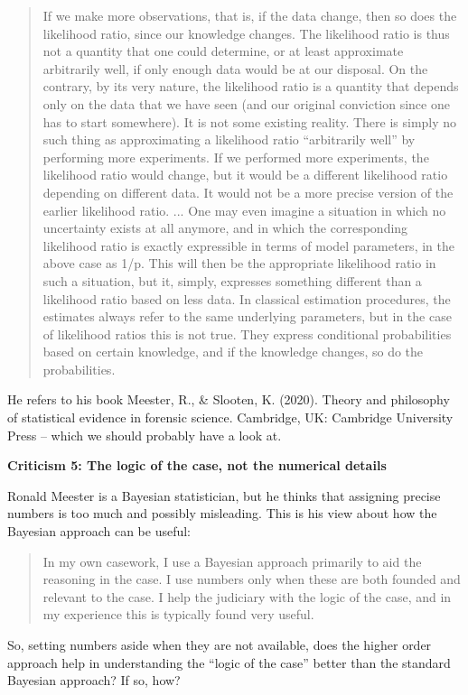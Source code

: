 \documentclass[
  10pt,
  dvipsnames,enabledeprecatedfontcommands]{scrartcl}
\begin{document}
\begin{quote}
If we make more observations, that is, if the data change, then so does the likelihood ratio, since our knowledge changes. The likelihood ratio is thus not a quantity that one could determine, or at least approximate arbitrarily well, if only enough data would be at our disposal. On the contrary, by its very nature, the likelihood ratio is a quantity that depends only on the data that we have seen (and our original conviction since one has to start somewhere). It is not some existing reality. There is simply no such thing as approximating a likelihood ratio “arbitrarily well” by performing more experiments. If we performed more experiments, the likelihood ratio would change, but it would be a different likelihood ratio depending on different data. It would not be a more precise version of the earlier likelihood ratio. ... One may even imagine a situation in which no uncertainty exists at all anymore, and in which the corresponding likelihood ratio is exactly expressible in terms of model parameters, in the above case as 1/p. This will then be the appropriate likelihood ratio in such a situation, but it, simply, expresses something different than a likelihood ratio based on less data. In classical estimation procedures, the estimates always refer to the same underlying parameters, but in the case of likelihood ratios this is not true. They express conditional probabilities based on certain knowledge, and if the knowledge changes, so do the probabilities.
\end{quote}

He refers to his book Meester, R., \& Slooten, K. (2020). Theory and
philosophy of statistical evidence in forensic science. Cambridge, UK:
Cambridge University Press -- which we should probably have a look at.

\textbf{Criticism 5: The logic of the case, not the numerical details}

Ronald Meester is a Bayesian statistician, but he thinks that assigning
precise numbers is too much and possibly misleading. This is his view
about how the Bayesian approach can be useful:

\begin{quote}
In my own casework, I use a Bayesian approach primarily to aid the reasoning in the case. I use numbers only when these are both founded and relevant to the case. I help the judiciary with the logic of the case, and in my experience this is typically found very useful.
\end{quote}

So, setting numbers aside when they are not available, does the higher
order approach help in understanding the ``logic of the case'' better
than the standard Bayesian approach? If so, how?
\end{document}
